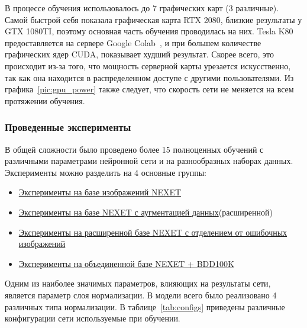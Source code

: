 \documentclass[11pt,a4paper]{extarticle}
\begin{document}
{		\noindent
		В процессе обучения использовалось до 7 графических карт (3 различные). 
		Самой быстрой себя показала графическая карта RTX 2080, близкие результаты у GTX 1080TI, поэтому основная часть обучения проводилась на них.
		Tesla K80 предоставляется на сервере Google Colab~\cite{colab}, и при большем количестве графических ядер CUDA, показывает худший результат.
		Скорее всего, это происходит из-за того, что мощность серверной карты урезается искусственно, так как она находится в распределенном доступе с другими пользователями.
		Из графика~\ref{pic:gpu_power} также следует, что скорость сети не меняется на всем протяжении обучения. 

		\subsubsection*{Проведенные эксперименты}
			
			В общей сложности было проведено более 15 полноценных обучений с различными параметрами нейронной сети и на разнообразных наборах данных.
			Эксперименты можно разделить на 4 основные группы: 
			\begin{itemize}
				\item \hyperref[sec:tests:nexet]{Эксперименты на базе изображений NEXET}~\cite{data:nexet}
				\item \hyperref[sec:tests:nexet_ext]{Эксперименты на базе NEXET с аугментацией данных}\footnotemark[1] (расширенной)
				\item \hyperref[sec:tests:nexet_no_err]{Эксперименты на расширенной базе NEXET с отделением от ошибочных изображений}
				\item \hyperref[sec:tests:nexet_bdd]{Эксперименты на объединенной базе NEXET + BDD100K}~\cite{data:bdd100k}
			\end{itemize}

			\noindent
			Одним из наиболее значимых параметров, влияющих на результаты сети, является параметр слоя нормализации.
			В модели всего было реализовано 4 различных типа нормализации.
			В таблице~\ref{tab:configs} приведены различные конфигурации сети используемые при обучении.
			
}
\end{document}
